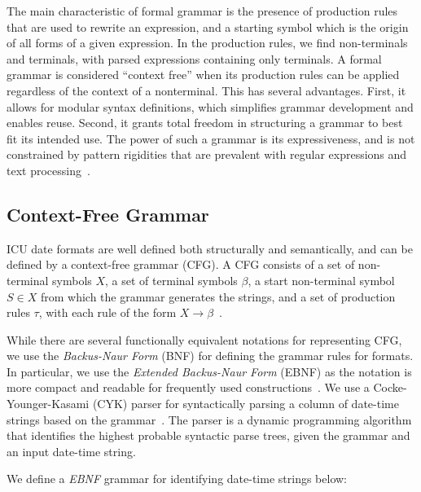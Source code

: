 The main characteristic of formal grammar is the presence of production rules that are used to rewrite an expression, and a starting symbol which is the origin of all forms of a given expression. In the production rules, we find non-terminals and terminals, with parsed expressions containing only terminals. A formal grammar is considered ``context free'' when its production rules can be applied regardless of the context of a nonterminal. This has several advantages. First, it allows for modular syntax definitions, which simplifies grammar development and enables reuse. Second, it grants total freedom
in structuring a grammar to best fit its intended use. The power of such a grammar is its expressiveness, and is not constrained by pattern rigidities that are prevalent with regular expressions and text processing~\cite{Grune:1990}.


\subsection{Context-Free Grammar}
ICU date formats are well defined both structurally and semantically, and can be defined by a context-free grammar (CFG). A CFG consists of a set of non-terminal symbols $X$, a set of terminal symbols $\beta$, a start non-terminal symbol $S \in X$ from which the grammar generates the strings, and a set of production rules $\tau$, with each rule of the form $X \rightarrow \beta$~\cite{Hopcroft:1990}. 

While there are several functionally equivalent notations for representing CFG, we use the \textit{Backus-Naur Form} (BNF) for defining the grammar rules for \dateparse formats. In particular, we use the \textit{Extended Backus-Naur Form} (EBNF) as the notation is more compact and readable for frequently used constructions~\cite{Grune:1990}. We use a Cocke-Younger-Kasami (CYK) parser for syntactically parsing a column of date-time strings based on the grammar~\cite{Cocke:1969,Younger67,Kasami:1965}. The parser is a dynamic programming algorithm that identifies the highest probable syntactic parse trees, given the grammar and an input date-time string.


We define a \textit{EBNF} grammar for identifying date-time strings below:

